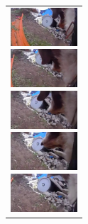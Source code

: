 \begin{figure}[htbp]
\begin{tabular}{l}
      \begin{minipage}{0.165\hsize}
        \begin{center}
          \includegraphics[clip, width=2.5cm]{./Figures/still_commandmatemate1.eps}
        \end{center}
      \end{minipage}
      \begin{minipage}{0.165\hsize}
        \begin{center}
          \includegraphics[clip, width=2.5cm]{./Figures/still_commandmatemate2.eps}
        \end{center}
      \end{minipage}
      \begin{minipage}{0.165\hsize}
        \begin{center}
          \includegraphics[clip, width=2.5cm]{./Figures/still_commandmatemate3.eps}
        \end{center}
      \end{minipage}
      \begin{minipage}{0.165\hsize}
        \begin{center}
          \includegraphics[clip, width=2.5cm]{./Figures/still_commandmatemate4.eps}
        \end{center}
      \end{minipage}
      \begin{minipage}{0.165\hsize}
        \begin{center}
          \includegraphics[clip, width=2.5cm]{./Figures/still_commandmatemate5.eps}

\end{center}
\end{minipage}
\end{tabular}
\end{figure}
